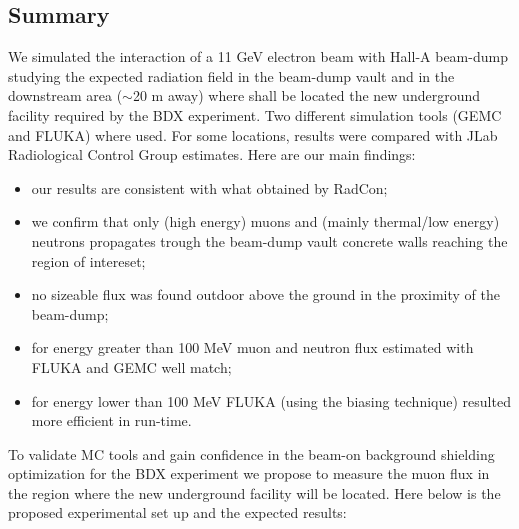 \subsection{Summary}
We simulated the interaction of a 11 GeV electron beam with Hall-A beam-dump studying the expected  radiation field in the beam-dump vault and in the downstream area ($\sim$20 m away) where shall be located the new underground  facility required by the BDX experiment. Two different  simulation tools (GEMC and FLUKA) where used. For some locations, results were compared with JLab Radiological Control Group estimates. Here are our main findings:
\begin{itemize}
\item{our results are consistent with what obtained by RadCon;}
\item{we confirm that only (high energy) muons and (mainly  thermal/low energy) neutrons propagates trough the beam-dump vault concrete walls  reaching the region of intereset; }
\item{no sizeable flux was found outdoor above the ground   in the proximity of the beam-dump;}
\item{for energy greater than 100 MeV muon and neutron flux estimated with FLUKA and GEMC well match;}
\item{for energy lower than 100 MeV  FLUKA (using the biasing technique)  resulted more efficient in run-time. }
\end{itemize}
To validate MC tools and gain confidence in the beam-on background shielding optimization  for the  BDX experiment we propose to measure the muon flux in the region where the new underground facility will be located. 
Here below is the proposed experimental set up and the expected results:
